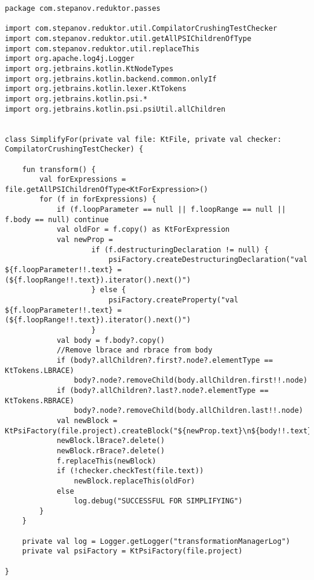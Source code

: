\begin{lstlisting}[caption = Исходный код файла SimplifyFor.kt]
package com.stepanov.reduktor.passes

import com.stepanov.reduktor.util.CompilatorCrushingTestChecker
import com.stepanov.reduktor.util.getAllPSIChildrenOfType
import com.stepanov.reduktor.util.replaceThis
import org.apache.log4j.Logger
import org.jetbrains.kotlin.KtNodeTypes
import org.jetbrains.kotlin.backend.common.onlyIf
import org.jetbrains.kotlin.lexer.KtTokens
import org.jetbrains.kotlin.psi.*
import org.jetbrains.kotlin.psi.psiUtil.allChildren


class SimplifyFor(private val file: KtFile, private val checker: CompilatorCrushingTestChecker) {

    fun transform() {
        val forExpressions = file.getAllPSIChildrenOfType<KtForExpression>()
        for (f in forExpressions) {
            if (f.loopParameter == null || f.loopRange == null || f.body == null) continue
            val oldFor = f.copy() as KtForExpression
            val newProp =
                    if (f.destructuringDeclaration != null) {
                        psiFactory.createDestructuringDeclaration("val ${f.loopParameter!!.text} = (${f.loopRange!!.text}).iterator().next()")
                    } else {
                        psiFactory.createProperty("val ${f.loopParameter!!.text} = (${f.loopRange!!.text}).iterator().next()")
                    }
            val body = f.body?.copy()
            //Remove lbrace and rbrace from body
            if (body?.allChildren?.first?.node?.elementType == KtTokens.LBRACE)
                body?.node?.removeChild(body.allChildren.first!!.node)
            if (body?.allChildren?.last?.node?.elementType == KtTokens.RBRACE)
                body?.node?.removeChild(body.allChildren.last!!.node)
            val newBlock = KtPsiFactory(file.project).createBlock("${newProp.text}\n${body!!.text}")
            newBlock.lBrace?.delete()
            newBlock.rBrace?.delete()
            f.replaceThis(newBlock)
            if (!checker.checkTest(file.text))
                newBlock.replaceThis(oldFor)
            else
                log.debug("SUCCESSFUL FOR SIMPLIFYING")
        }
    }

    private val log = Logger.getLogger("transformationManagerLog")
    private val psiFactory = KtPsiFactory(file.project)

}
\end{lstlisting}